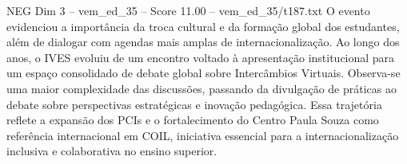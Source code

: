 \begin{textsample}{NEG Dim 3 – vem\_ed\_35 – Score 11.00 – vem\_ed\_35/t187.txt}
O evento evidenciou a importância da troca cultural e da formação global dos estudantes, além de dialogar com agendas mais amplas de internacionalização.
Ao longo dos anos, o IVES evoluiu de um encontro voltado à apresentação institucional para um espaço consolidado de debate global sobre Intercâmbios Virtuais.
Observa-se uma maior complexidade das discussões, passando da divulgação de práticas ao debate sobre perspectivas estratégicas e inovação pedagógica.
Essa trajetória reflete a expansão dos PCIs e o fortalecimento do Centro Paula Souza como referência internacional em COIL, iniciativa essencial para a internacionalização inclusiva e colaborativa no ensino superior.

\end{textsample}
